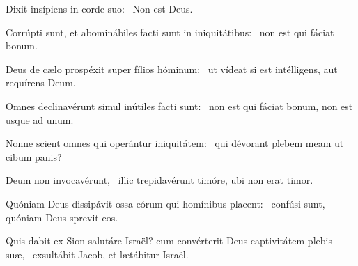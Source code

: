 \item Dixit insípiens in corde suo:~\psstar{} Non est Deus.

\item Corrúpti sunt, et abominábiles facti sunt in iniquitátibus:~\psstar{} non est qui fáciat bonum.

\item Deus de cælo prospéxit super fílios hóminum:~\psstar{} ut vídeat si est intélligens, aut requírens Deum.

\item Omnes declinavérunt simul inútiles facti sunt:~\psstar{} non est qui fáciat bonum, non est usque ad unum.

\item Nonne scient omnes qui operántur iniquitátem:~\psstar{} qui dévorant plebem meam ut cibum panis?

\item Deum non invocavérunt,~\psstar{} illic trepidavérunt timóre, ubi non erat timor.

\item Quóniam Deus dissipávit ossa eórum qui homínibus placent:~\psstar{} confúsi sunt, quóniam Deus sprevit eos.

\item Quis dabit ex Sion salutáre Israël? cum convérterit Deus captivitátem plebis suæ,~\psstar{} exsultábit Jacob, et lætábitur Israël.